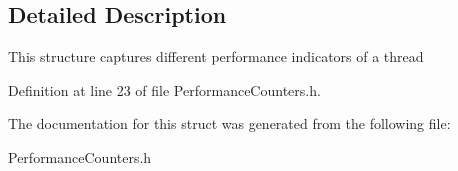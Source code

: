 \subsection{Detailed Description}
This structure captures different performance indicators of a thread 

Definition at line 23 of file Performance\-Counters.\-h.



The documentation for this struct was generated from the following file\-:\begin{DoxyCompactItemize}
\item 
Performance\-Counters.\-h\end{DoxyCompactItemize}

